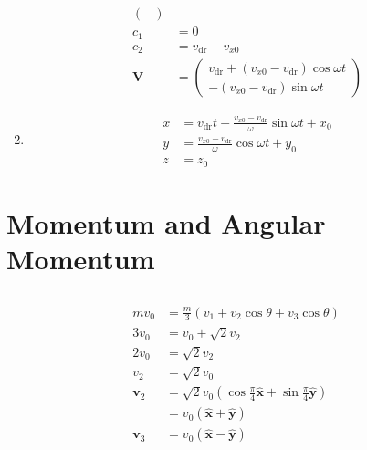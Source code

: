 \documentclass{article}
\renewcommand{\vec}[1]{\boldsymbol{\mathbf{#1}}}
\newcommand{\uvec}[1]{\hat{\vec{#1}}}
\begin{document}
\begin{enumerate}
\begin{align*}
\begin{pmatrix}
                            \end{pmatrix}                                    \\
          c_1             & = 0                                                   \\
          c_2             & = v_\text{dr} - v_{x0}                                \\
          \mathbf{V}      & = \begin{pmatrix}
                                v_\text{dr} + (v_{x0} - v_\text{dr}) \cos \omega t \\
                                -(v_{x0} - v_\text{dr}) \sin \omega t
                              \end{pmatrix}
        \end{align*}

  \item

        \begin{align*}
          x & = v_\text{dr} t + \frac{v_{x0} - v_\text{dr}}{\omega} \sin \omega t + x_0 \\
          y & = \frac{v_{x0} - v_\text{dr}}{\omega} \cos \omega t + y_0                 \\
          z & = z_0
        \end{align*}
\end{enumerate}

\section{Momentum and Angular Momentum}

\setcounter{subsection}{2}
\subsection{}

\begin{align*}
  m v_0     & = \frac{m}{3} (v_1 + v_2 \cos \theta + v_3 \cos \theta)                                 \\
  3 v_0     & = v_0 + \sqrt{2} v_2                                                                    \\
  2 v_0     & = \sqrt{2} v_2                                                                          \\
  v_2       & = \sqrt{2} v_0                                                                          \\
  \vec{v}_2 & = \sqrt{2} v_0 \left( \cos \frac{\pi}{4} \uvec{x} + \sin \frac{\pi}{4} \uvec{y} \right) \\
            & = v_0 (\uvec{x} + \uvec{y})                                                             \\
  \vec{v}_3 & = v_0 (\uvec{x} - \uvec{y})
\end{align*}
\end{document}
